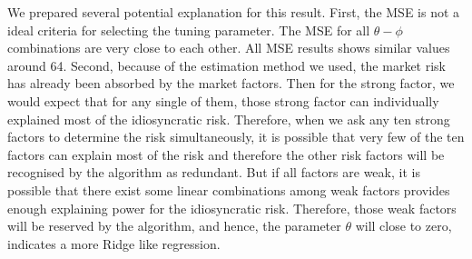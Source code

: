 We prepared several potential explanation for this result.
First, the MSE is not a ideal criteria for selecting the tuning parameter.
The MSE for all $\theta - \phi$ combinations are very close to each other.
All MSE results shows similar values around 64.
Second, because of the estimation method we used, the market risk has already been absorbed by the market factors.
Then for the strong factor, we would expect that for any single of them, those strong factor can individually explained most of the idiosyncratic risk.
Therefore, when we ask any ten strong factors to determine the risk simultaneously, it is possible that very few of the ten factors can explain most of the risk and therefore the other risk factors will be recognised by the algorithm as redundant.
But if all factors are weak, it is possible that there exist some linear combinations among weak factors provides enough explaining power for the idiosyncratic risk.
Therefore, those weak factors will be reserved by the algorithm, and hence, the parameter $\theta$ will close to zero, indicates a more Ridge like regression.





